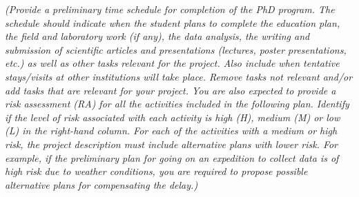 %
%
\textit{(Provide a preliminary time schedule for completion of the PhD program. The schedule should indicate when the student plans to complete the education plan, the field and laboratory work (if any), the data analysis, the writing and submission of scientific articles and presentations (lectures, poster presentations, etc.) as well as other tasks relevant for the project. Also include when tentative stays/visits at other institutions will take place. Remove tasks not relevant and/or add tasks that are relevant for your project. You are also expected to provide a risk assessment (RA) for all the activities included in the following plan. Identify if the level of risk associated with each activity is high (H), medium (M) or low (L) in the right-hand column. For each of the activities with a medium or high risk, the project description must include alternative plans with lower risk. For example, if the preliminary plan for going on an expedition to collect data is of high risk due to weather conditions, you are required to propose possible alternative plans for compensating the delay.)}


%
%


